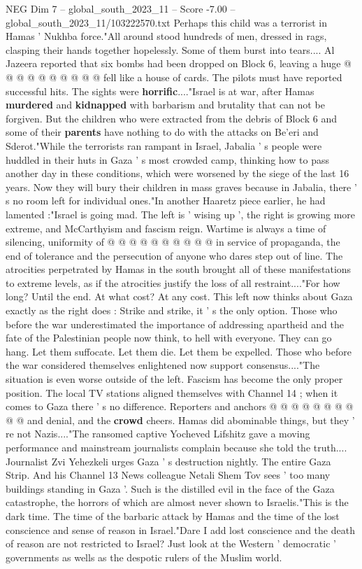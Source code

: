 \begin{textsample}{NEG Dim 7 – global\_south\_2023\_11 – Score -7.00 – global\_south\_2023\_11/103222570.txt}
Perhaps this child was a terrorist in Hamas ' Nukhba force."All around stood hundreds of men, dressed in rags, clasping their hands together hopelessly.
Some of them burst into tears....
Al Jazeera reported that six bombs had been dropped on Block 6, leaving a huge @ @ @ @ @ @ @ @ @ @ fell like a house of cards.
The pilots must have reported successful hits.
The sights were \textbf{horrific}...."Israel is at war, after Hamas \textbf{murdered} and \textbf{kidnapped} with barbarism and brutality that can not be forgiven.
But the children who were extracted from the debris of Block 6 and some of their \textbf{parents} have nothing to do with the attacks on Be'eri and Sderot."While the terrorists ran rampant in Israel, Jabalia ' s people were huddled in their huts in Gaza ' s most crowded camp, thinking how to pass another day in these conditions, which were worsened by the siege of the last 16 years.
Now they will bury their children in mass graves because in Jabalia, there ' s no room left for individual ones."In another Haaretz piece earlier, he had lamented :"Israel is going mad.
The left is ' wising up ', the right is growing more extreme, and McCarthyism and fascism reign.
Wartime is always a time of silencing, uniformity of @ @ @ @ @ @ @ @ @ @ in service of propaganda, the end of tolerance and the persecution of anyone who dares step out of line.
The atrocities perpetrated by Hamas in the south brought all of these manifestations to extreme levels, as if the atrocities justify the loss of all restraint...."For how long?
Until the end.
At what cost?
At any cost.
This left now thinks about Gaza exactly as the right does : Strike and strike, it ' s the only option.
Those who before the war underestimated the importance of addressing apartheid and the fate of the Palestinian people now think, to hell with everyone.
They can go hang.
Let them suffocate.
Let them die.
Let them be expelled.
Those who before the war considered themselves enlightened now support consensus...."The situation is even worse outside of the left.
Fascism has become the only proper position.
The local TV stations aligned themselves with Channel 14 ; when it comes to Gaza there ' s no difference.
Reporters and anchors @ @ @ @ @ @ @ @ @ @ and denial, and the \textbf{crowd} cheers.
Hamas did abominable things, but they ' re not Nazis...."The ransomed captive Yocheved Lifshitz gave a moving performance and mainstream journalists complain because she told the truth....
Journalist Zvi Yehezkeli urges Gaza ' s destruction nightly.
The entire Gaza Strip.
And his Channel 13 News colleague Netali Shem Tov sees ' too many buildings standing in Gaza '.
Such is the distilled evil in the face of the Gaza catastrophe, the horrors of which are almost never shown to Israelis."This is the dark time.
The time of the barbaric attack by Hamas and the time of the lost conscience and sense of reason in Israel."Dare I add lost conscience and the death of reason are not restricted to Israel?
Just look at the Western ' democratic ' governments as wells as the despotic rulers of the Muslim world.

\end{textsample}
